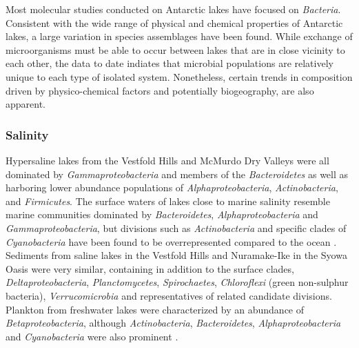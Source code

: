 Most molecular studies conducted on Antarctic lakes have focused on \emph{Bacteria}.
Consistent with the wide range of physical and chemical properties of Antarctic lakes, a large variation in species assemblages have been found.
While exchange of microorganisms must be able to occur between lakes that are in close vicinity to each other, the data to date indiates that microbial populations are relatively unique to each type of isolated system. 
Nonetheless, certain trends in composition driven by physico-chemical factors and potentially biogeography, are also apparent.
\subsubsection{Salinity}
Hypersaline lakes from the Vestfold Hills \cite{Bowman2000a} and McMurdo Dry Valleys \cite{Glatz2006, Mosier2007} were all dominated by \emph{Gammaproteobacteria} and members of the \emph{Bacteroidetes} as well as harboring lower abundance populations of \emph{Alphaproteobacteria}, \emph{Actinobacteria}, and \emph{Firmicutes}.
The surface waters of lakes close to marine salinity resemble marine communities dominated by \emph{Bacteroidetes}, \emph{Alphaproteobacteria} and \emph{Gammaproteobacteria}, but divisions such as \emph{Actinobacteria} and specific clades of \emph{Cyanobacteria} have been found to be overrepresented compared to the ocean \cite{Lauro2011}.
Sediments from saline lakes in the Vestfold Hills \cite{Bowman2000b} and Nuramake-Ike in the Syowa Oasis \cite{Kurosawa2010} were very similar, containing in addition to the surface clades, \emph{Deltaproteobacteria}, \emph{Planctomycetes}, \emph{Spirochaetes}, \emph{Chloroflexi} (green non-sulphur bacteria), \emph{Verrucomicrobia} and representatives of related candidate divisions.
Plankton from freshwater lakes were characterized by an abundance of \emph{Betaproteobacteria}, although \emph{Actinobacteria}, \emph{Bacteroidetes}, \emph{Alphaproteobacteria} and \emph{Cyanobacteria} were also prominent \cite{Pearce2003a, Pearce2005a, Pearce2005b, Schiaffino2009}. 

